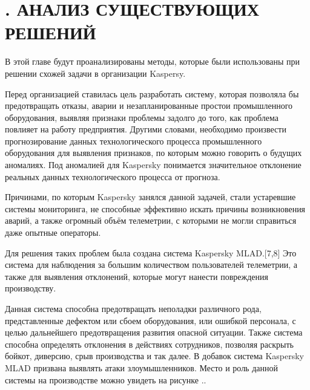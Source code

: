 \setcounter{chaptercntr}{2}

\sectionbreak \section*{
  \gostTitleFont
  \redline
  \thechaptercntr .
  АНАЛИЗ СУЩЕСТВУЮЩИХ РЕШЕНИЙ
}

\subtitlespace

{\gostFont

  \par \redline В этой главе будут проанализированы методы, которые были использованы при решении схожей задачи в организации Kaspersy.

  \par \redline	Перед организацией ставилась цель разработать систему, которая позволяла бы предотвращать отказы, аварии и незапланированные простои промышленного оборудования, выявляя признаки проблемы задолго до того, как проблема повлияет на работу предприятия. Другими словами, необходимо произвести прогнозирование данных технологического процесса промышленного оборудования для выявления признаков, по которым можно говорить о будущих аномалиях. Под аномалией для Kaspersky понимается значительное отклонение реальных данных технологического процесса от прогноза.

  \par \redline	Причинами, по которым Kaspersky занялся данной задачей, стали устаревшие системы мониторинга, не способные эффективно искать причины возникновения аварий, а также огромный объём телеметрии, с которыми не могли справиться даже опытные операторы.

  \par \redline	Для решения таких проблем была создана система Kaspersky MLAD.[7,8] Это система для наблюдения за большим количеством пользователей телеметрии, а также для выявления отклонений, которые могут нанести повреждения производству.

  \par \redline Данная система способна предотвращать неполадки различного рода, представленные дефектом или сбоем оборудования, или ошибкой персонала, с целью дальнейшего предотвращения развития опасной ситуации. Также система способна определять отклонения в действиях сотрудников, позволяя раскрыть бойкот, диверсию, срыв производства и так далее. В добавок система Kaspersky MLAD призвана выявлять атаки злоумышленников. Место и роль данной системы на производстве можно увидеть на рисунке \thechaptercntr .\theimagecntr.

}
